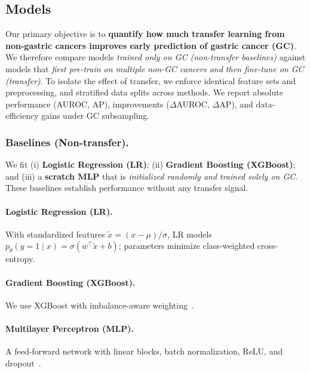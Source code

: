 \documentclass[journal,article,submit,pdftex,moreauthors]{Definitions/mdpi}
\begin{document}
\subsection{Models}
Our primary objective is to \textbf{quantify how much transfer learning from non-gastric cancers improves early prediction of gastric cancer (GC)}. 
We therefore compare models \emph{trained only on GC (non-transfer baselines)} against models that \emph{first pre-train on multiple non-GC cancers and then fine-tune on GC (transfer)}.
To isolate the effect of transfer, we enforce identical feature sets and preprocessing, and stratified data splits across methods. 
{\color{red}
We report absolute performance (AUROC, AP), improvements ($\Delta$AUROC, $\Delta$AP), and data-efficiency gains under GC subsampling.
}



\subsubsection{Baselines (Non-transfer).} 
We fit (i) \textbf{Logistic Regression (LR)}; 
(ii) \textbf{Gradient Boosting (XGBoost)}; and 
(iii) a \textbf{scratch MLP} that is \emph{initialized randomly and trained solely on GC}. 
These baselines establish performance without any transfer signal.

{\color{red}
\paragraph{Logistic Regression (LR).} With standardized features $\tilde{x}=(x-\mu)/\sigma$, LR models $p_\theta(y = 1\mid x)=\sigma(w^\top \tilde{x}+b)$; parameters minimize class-weighted cross-entropy.

\paragraph{Gradient Boosting (XGBoost).} We use XGBoost with imbalance-aware weighting~\citep{Chen2016_XGBoost}.

\paragraph{Multilayer Perceptron (MLP).} A feed-forward network with linear blocks, batch normalization, ReLU, and dropout~\citep{Ioffe2015_BN,Srivastava2014_Dropout}.
}
\end{document}
